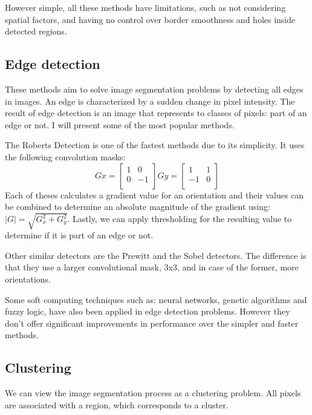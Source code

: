 \documentclass[12pt]{report}
\begin{document}
	However simple, all these methods have limitations, such as not considering spatial factors, and having no control over border smoothness and holes inside detected regions.
	
	\subsection{Edge detection}
	These methods aim to solve image segmentation problems by detecting all edges in images. An edge is characterized by a sudden change in pixel intensity\cite{image_segmentation_techniques}. The result of edge detection is an image that represents to classes of pixels: part of an edge or not. I will present some of the most popular methods.
	
	The Roberts Detection\cite{edge_detection_survey} is one of the fastest methods due to its simplicity. It uses the following convolution masks:
	\[
	Gx =
	\begin{bmatrix}
		1 & 0 \\
		0 & -1 \\
	\end{bmatrix}
	Gy =
	\begin{bmatrix}
	1 & 1 \\
	-1 & 0 \\
	\end{bmatrix}
	\]
	Each of theses calculates a gradient value for an orientation and their values can be combined to determine an absolute magnitude of the gradient using: \(|G|=\sqrt{G_x^2 + G_y^2}\). Lastly, we can apply thresholding for the resulting value to determine if it is part of an edge or not.
	
	Other similar detectors are the Prewitt and the Sobel detectors\cite{edge_detection_survey}. The difference is that they use a larger convolutional mask, 3x3, and in case of the former, more orientations.
	
	Some soft computing techniques such as: neural networks, genetic algorithms and fuzzy logic\cite{edge_detection_survey}, have also been applied in edge detection problems. However they don't offer significant improvements in performance over the simpler and faster methods.
	
	\subsection{Clustering}
	We can view the image segmentation process as a clustering problem. All pixels are associated with a region, which corresponds to a cluster.
	
\end{document}
